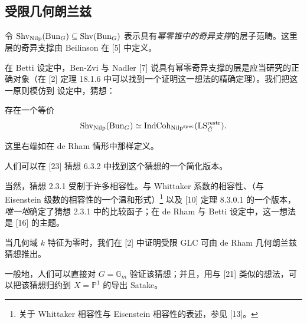 \subsection{受限几何朗兰兹}

\pnum{}令 $\mathrm{Shv}_{\mathrm{Nilp}}(\mathrm{Bun}_G) \subseteq \mathrm{Shv}(\mathrm{Bun}_G)$ 表示具有\emph{幂零锥中的奇异支撑}的层子范畴。这里 \et{} 层的奇异支撑由 Beilinson 在 [5] 中定义。

在 Betti 设定中，Ben-Zvi 与 Nadler [7] 说具有幂零奇异支撑的层是应当研究的正确对象（在 [2] 定理 18.1.6 中可以找到一个证明这一想法的精确定理）。我们把这一原则模仿到 \et{} 设定中，猜想：

\begin{conj}[受限几何朗兰兹猜想]
存在一个等价
\[
  \mathrm{Shv}_{\mathrm{Nilp}}(\mathrm{Bun}_G) \simeq \mathrm{IndCoh}_{\mathrm{Nilp}^{\mathrm{spec}}}(\mathrm{LS}^{\mathrm{restr}}_{\check{G}}).
\]
\end{conj}

这里右端如在 de Rham 情形中那样定义。

\begin{remark}
人们可以在 [23] 猜想 6.3.2 中找到这个猜想的一个简化版本。
\end{remark}

\begin{remark}
当然，猜想 2.3.1 受制于许多相容性。与 Whittaker 系数的相容性、（与 Eisenstein 级数的相容性的一个温和形式）\footnote{关于 Whittaker 相容性与 Eisenstein 相容性的表述，参见 [13]。} 以及 [10] 定理 8.3.0.1 的一个版本，\emph{唯一地}确定了猜想 2.3.1 中的比较函子；在 de Rham 与 Betti 设定中，这一想法是 [16] 的主题。
\end{remark}

 当几何域 $k$ 特征为零时，我们在 [2] 中证明受限 GLC 可由 de Rham 几何朗兰兹猜想推出。

一般地，人们可以直接对 $G = \mathbb{G}_m$ 验证该猜想；并且，用与 [21] 类似的想法，可以把该猜想归约到 $X = \mathbb{P}^1$ 的导出 Satake。

